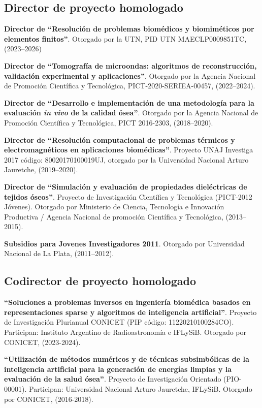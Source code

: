 \documentclass[margin,line]{res}
\begin{document}
\begin{resume}
\subsection{ Director de proyecto homologado}

\textbf{Director de ``Resolución de problemas biomédicos y biomiméticos por elementos finitos''}. Otorgado por la UTN, PID UTN MAECLP0009851TC, (2023--2026)

\textbf{Director de ``Tomografía de microondas: algoritmos de reconstrucción, validación experimental y aplicaciones''}. Otorgado por la Agencia Nacional de Promoción Científica y Tecnológica, PICT-2020-SERIEA-00457, (2022--2024).

\textbf{Director de ``Desarrollo e implementación de una metodología para la evaluación \textit{in vivo} de la calidad ósea''}. Otorgado por la Agencia Nacional de Promoción Científica y Tecnológica, PICT 2016-2303, (2018--2020).

\textbf{Director de ``Resolución computacional de problemas térmicos y electromagnéticos en aplicaciones biomédicas''}. Proyecto UNAJ Investiga 2017 código: 80020170100019UJ, otorgado por la Universidad Nacional Arturo Jauretche, (2019--2020).

\textbf{Director de ``Simulación y evaluación de propiedades dieléctricas de tejidos óseos''}. Proyecto de Investigación Científica y Tecnológica (PICT-2012 Jóvenes). Otorgado por Ministerio de Ciencia, Tecnología e Innovación Productiva / Agencia Nacional de promoción Científica y Tecnológica, (2013--2015).

\textbf{Subsidios para Jovenes Investigadores 2011}. Otorgado por Universidad Nacional de La Plata, (2011--2012).

\subsection{ Codirector de proyecto homologado}

\textbf{``Soluciones a problemas inversos en ingeniería biomédica basados en representaciones sparse y algoritmos de inteligencia artificial''}. Proyecto de Investigación Plurianual CONICET (PIP código: 11220210100284CO). Participan: Instituto Argentino de Radioastronomía e IFLySiB. Otorgado por CONICET, (2023-2024).

\textbf{``Utilización de métodos numéricos y de técnicas subsimbólicas de la inteligencia artificial para la generación de energías  limpias y la evaluación de la salud ósea''}. Proyecto de Investigación Orientado (PIO-00001). Participan: Universidad Nacional Arturo Jauretche, IFLySiB. Otorgado por CONICET, (2016-2018).


\end{resume}
\end{document}
